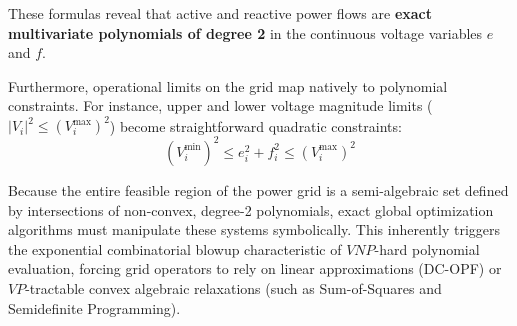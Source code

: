 \documentclass[11pt, a4paper]{article}
\begin{document}
These formulas reveal that active and reactive power flows are \textbf{exact multivariate polynomials of degree 2} in the continuous voltage variables $e$ and $f$. 

Furthermore, operational limits on the grid map natively to polynomial constraints. For instance, upper and lower voltage magnitude limits ($|V_i|^2 \le (V_i^{\max})^2$) become straightforward quadratic constraints:
\begin{equation}
    (V_i^{\min})^2 \le e_i^2 + f_i^2 \le (V_i^{\max})^2
\end{equation}

Because the entire feasible region of the power grid is a semi-algebraic set defined by intersections of non-convex, degree-2 polynomials, exact global optimization algorithms must manipulate these systems symbolically. This inherently triggers the exponential combinatorial blowup characteristic of $VNP$-hard polynomial evaluation, forcing grid operators to rely on linear approximations (DC-OPF) or $VP$-tractable convex algebraic relaxations (such as Sum-of-Squares and Semidefinite Programming).
\end{document}
